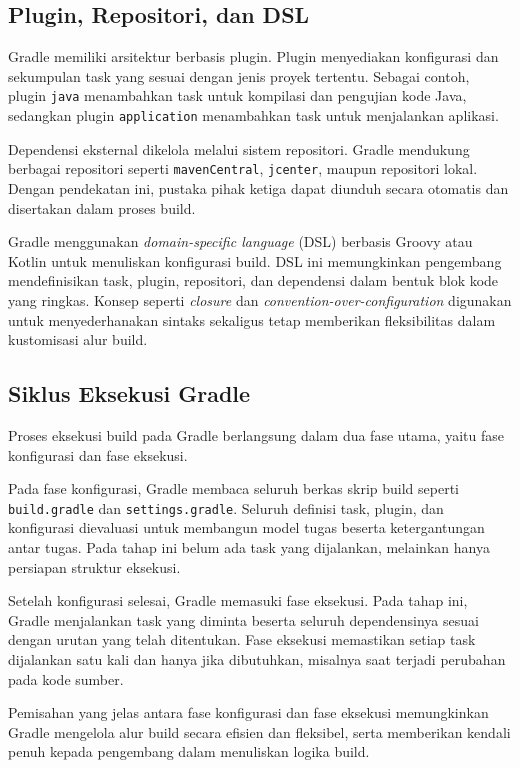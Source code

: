 \subsection{Plugin, Repositori, dan DSL}
Gradle memiliki arsitektur berbasis plugin. Plugin menyediakan konfigurasi dan sekumpulan task yang sesuai dengan jenis proyek tertentu. Sebagai contoh, plugin \texttt{java} menambahkan task untuk kompilasi dan pengujian kode Java, sedangkan plugin \texttt{application} menambahkan task untuk menjalankan aplikasi.  

Dependensi eksternal dikelola melalui sistem repositori. Gradle mendukung berbagai repositori seperti \texttt{mavenCentral}, \texttt{jcenter}, maupun repositori lokal. Dengan pendekatan ini, pustaka pihak ketiga dapat diunduh secara otomatis dan disertakan dalam proses build.  

Gradle menggunakan \textit{domain-specific language} (DSL) berbasis Groovy atau Kotlin untuk menuliskan konfigurasi build. DSL ini memungkinkan pengembang mendefinisikan task, plugin, repositori, dan dependensi dalam bentuk blok kode yang ringkas. Konsep seperti \textit{closure} dan \textit{convention-over-configuration} digunakan untuk menyederhanakan sintaks sekaligus tetap memberikan fleksibilitas dalam kustomisasi alur build.


\subsection{Siklus Eksekusi Gradle}
Proses eksekusi build pada Gradle berlangsung dalam dua fase utama, yaitu fase konfigurasi dan fase eksekusi.  

Pada fase konfigurasi, Gradle membaca seluruh berkas skrip build seperti \texttt{build.gradle} dan \texttt{settings.gradle}. Seluruh definisi task, plugin, dan konfigurasi dievaluasi untuk membangun model tugas beserta ketergantungan antar tugas. Pada tahap ini belum ada task yang dijalankan, melainkan hanya persiapan struktur eksekusi.  

Setelah konfigurasi selesai, Gradle memasuki fase eksekusi. Pada tahap ini, Gradle menjalankan task yang diminta beserta seluruh dependensinya sesuai dengan urutan yang telah ditentukan. Fase eksekusi memastikan setiap task dijalankan satu kali dan hanya jika dibutuhkan, misalnya saat terjadi perubahan pada kode sumber.  

Pemisahan yang jelas antara fase konfigurasi dan fase eksekusi memungkinkan Gradle mengelola alur build secara efisien dan fleksibel, serta memberikan kendali penuh kepada pengembang dalam menuliskan logika build.
